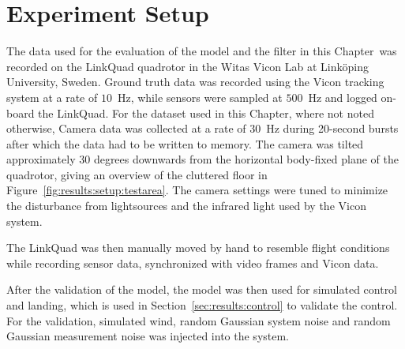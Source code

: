 \section{Experiment Setup}
    The data used for the evaluation of the model and the filter in
    this Chapter~was recorded on the LinkQuad quadrotor in the Witas Vicon Lab
    at Linköping University, Sweden. Ground truth data was recorded using
    the Vicon tracking system at a rate of $10$~Hz, while sensors were sampled
    at $500$~Hz and logged on-board the LinkQuad.
    For the dataset used in this Chapter, where not noted otherwise,
    Camera data was collected at a rate of $30$~Hz during 20-second bursts after
    which the data had to be written to memory.
    The camera was tilted approximately $30$ degrees downwards from the
    horizontal body-fixed plane of the quadrotor, giving an overview of the cluttered
    floor in Figure~\ref{fig:results:setup:testarea}.
    The camera settings were tuned to minimize the disturbance from lightsources
    and the infrared light used by the Vicon system.

    The LinkQuad was then manually moved by hand to resemble flight conditions
    while recording sensor data, synchronized with video frames and Vicon data.


    After the validation of the model, the model was then used for simulated
    control and landing, which is used in Section~\ref{sec:results:control}
    to validate the control. For the validation, simulated wind, random Gaussian
    system noise and random Gaussian measurement noise was injected into
    the system.
